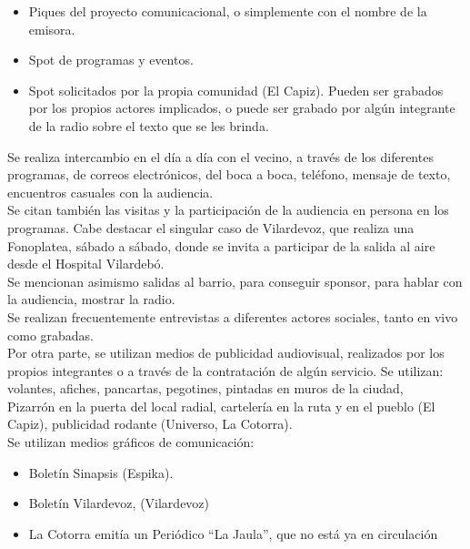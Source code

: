 \begin{itemize}
  \item Piques del proyecto comunicacional, o simplemente con el nombre de la emisora.
  \item Spot de programas y eventos.
  \item Spot solicitados por la propia comunidad (El Capiz). Pueden ser grabados por los propios actores implicados, o puede ser grabado por algún integrante de la radio sobre el texto que se les brinda.
\end{itemize}

Se realiza intercambio en el día a día con el vecino, a través de los diferentes programas, de correos electrónicos, del boca a boca, teléfono, mensaje de texto, encuentros casuales con la audiencia.\\

Se citan también las visitas y la participación de la audiencia en persona en los programas. Cabe destacar el singular caso de Vilardevoz, que realiza una Fonoplatea, sábado a sábado, donde se invita a participar de la salida al aire desde el Hospital Vilardebó.\\

Se mencionan asimismo salidas al barrio, para conseguir sponsor, para hablar con la audiencia, mostrar la radio.\\

Se realizan frecuentemente entrevistas a diferentes actores sociales, tanto en vivo como grabadas.\\

Por otra parte, se utilizan medios de publicidad audiovisual, realizados por los propios integrantes o a través de la  contratación de algún servicio. Se utilizan: volantes, afiches, pancartas, pegotines, pintadas en muros de la ciudad,\\

Pizarrón en la puerta del local radial, cartelería en la ruta y en el pueblo (El Capiz), publicidad rodante (Universo, La Cotorra).\\

Se utilizan medios gráficos de comunicación:\\

\begin{itemize}
  \item Boletín Sinapsis (Espika).
  \item Boletín Vilardevoz, (Vilardevoz)
  \item La Cotorra emitía un Periódico “La Jaula”, que no está ya en circulación
\end{itemize}


